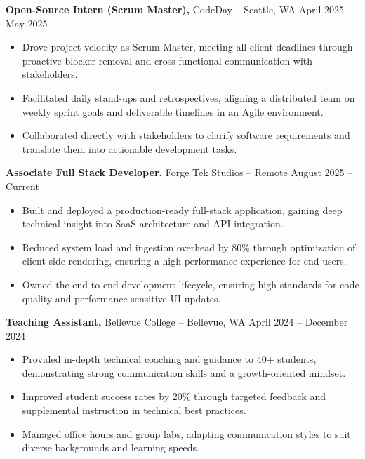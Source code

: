 \documentclass[11pt]{article}       %
\begin{document}
\textbf{Open-Source Intern (Scrum Master),} {CodeDay} -- Seattle, WA \hfill April 2025 -- May 2025 \\
\vspace{-9pt}
\begin{itemize}
  \item Drove project velocity as Scrum Master, meeting all client deadlines through proactive blocker removal and cross-functional communication with stakeholders.
  \item Facilitated daily stand-ups and retrospectives, aligning a distributed team on weekly sprint goals and deliverable timelines in an Agile environment.
  \item Collaborated directly with stakeholders to clarify software requirements and translate them into actionable development tasks.
\end{itemize}

\textbf{Associate Full Stack Developer,} {Forge Tek Studios} -- Remote \hfill August 2025 -- Current 
\vspace{-9pt}
\begin{itemize}
  \item Built and deployed a production-ready full-stack application, gaining deep technical insight into SaaS architecture and API integration.
  \item Reduced system load and ingestion overhead by 80\% through optimization of client-side rendering, ensuring a high-performance experience for end-users.
  \item Owned the end-to-end development lifecycle, ensuring high standards for code quality and performance-sensitive UI updates.
\end{itemize}

\textbf{Teaching Assistant,} {Bellevue College} -- Bellevue, WA \hfill April 2024 -- December 2024 \\
\vspace{-9pt}
\begin{itemize}
  \item Provided in-depth technical coaching and guidance to 40+ students, demonstrating strong communication skills and a growth-oriented mindset.
  \item Improved student success rates by 20\% through targeted feedback and supplemental instruction in technical best practices.
  \item Managed office hours and group labs, adapting communication styles to suit diverse backgrounds and learning speeds.
\end{itemize}
\end{document}
